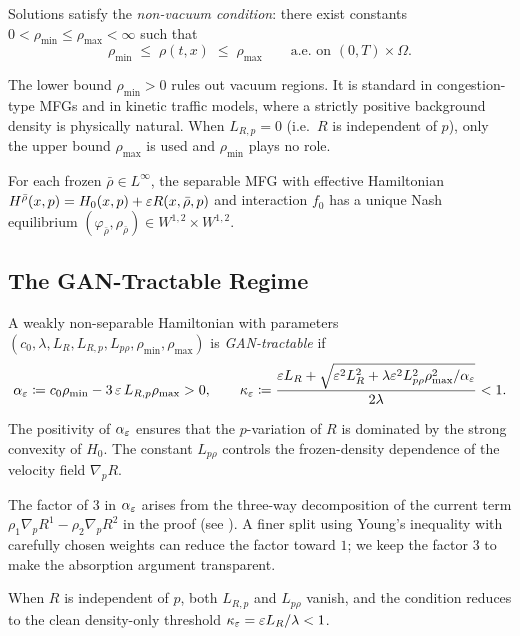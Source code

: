 \begin{assumption}\label{ass:bound}
Solutions satisfy the \emph{non-vacuum condition}: there exist constants
$0 < \rho_{\min} \leq \rho_{\max} < \infty$ such that
\[
  \rho_{\min} \;\leq\; \rho(t,x) \;\leq\; \rho_{\max}
  \qquad \text{a.e.\ on } (0,T)\times\Omega.
\]
\end{assumption}
\begin{remark}
The lower bound $\rho_{\min} > 0$ rules out vacuum regions.
It is standard in congestion-type MFGs and in kinetic traffic models,
where a strictly positive background density is physically natural.
When $L_{R,p} = 0$ (i.e.\ $R$ is independent of $p$), only the
upper bound $\rho_{\max}$ is used and $\rho_{\min}$ plays no role.
\end{remark}

\begin{assumption}\label{ass:unique}
For each frozen $\bar\rho \in L^\infty$, the separable MFG with effective
Hamiltonian $H^{\bar\rho}(x,p) = H_0(x,p) + \varepsilon R(x,\bar\rho,p)$
and interaction $f_0$ has a unique Nash equilibrium
$(\varphi_{\bar\rho},\rho_{\bar\rho}) \in W^{1,2}\times W^{1,2}$.
\end{assumption}

\subsection{The GAN-Tractable Regime}

\begin{definition}\label{def:tractable_full}
A weakly non-separable Hamiltonian with parameters
$(c_0, \lambda, L_R, L_{R,p}, L_{p\rho}, \rho_{\min}, \rho_{\max})$ is
\emph{GAN-tractable} if
\begin{equation}\label{eq:gan_tractable}
  \alpha_\varepsilon \coloneqq c_0\rho_{\min}
  -3\,\varepsilon\,L_{R,p}\rho_{\max} >0,
  \qquad
  \kappa_\varepsilon \coloneqq
  \frac{\varepsilon L_R+
  \sqrt{\varepsilon^2L_R^2+
  \lambda\varepsilon^2L_{p\rho}^2\rho_{\max}^2/\alpha_\varepsilon}}{2\lambda}
  <1.
\end{equation}
\end{definition}

\noindent The positivity of $\alpha_\varepsilon$ ensures that the $p$-variation of
$R$ is dominated by the strong convexity of $H_0$.  The constant $L_{p\rho}$
controls the frozen-density dependence of the velocity field $\nabla_pR$.
\begin{remark}
The factor of $3$ in $\alpha_\varepsilon$ arises from the three-way
decomposition of the current term $\rho_1\nabla_p R^1 - \rho_2\nabla_p R^2$
in the proof (see ).
A finer split using Young's inequality with carefully chosen weights
can reduce the factor toward $1$; we keep the factor $3$ to make the
absorption argument transparent.
\end{remark}
When $R$ is independent of $p$, both $L_{R,p}$ and $L_{p\rho}$ vanish, and the
condition reduces to the clean density-only threshold
$\kappa_\varepsilon=\varepsilon L_R/\lambda<1$.


